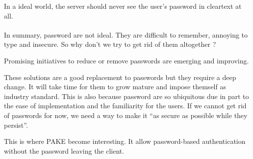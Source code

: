 \documentclass[../report.tex]{subfiles}
\begin{document}
In a ideal world, the server should never see the user's password in cleartext at all.


\paragraph{}

In summary, password are not ideal. They are difficult to remember, annoying to type and insecure.
So why don't we try to get rid of them altogether ?

Promising initiatives to reduce or remove passwords are emerging and improving. %

These solutions are a good replacement to passwords but they require a deep change. It will take time for them to grow mature and impose themself as industry standard.
This is also because password are so ubiquitous due in part to the ease of implementation and the familiarity for the users.
If we cannot get rid of passwords for now, we need a way to make it ``as secure as possible while they persist''. %


This is where PAKE become interesting. It allow password-based authentication without the password leaving the client.




\subsection{}
\paragraph{}

% 
\end{document}
